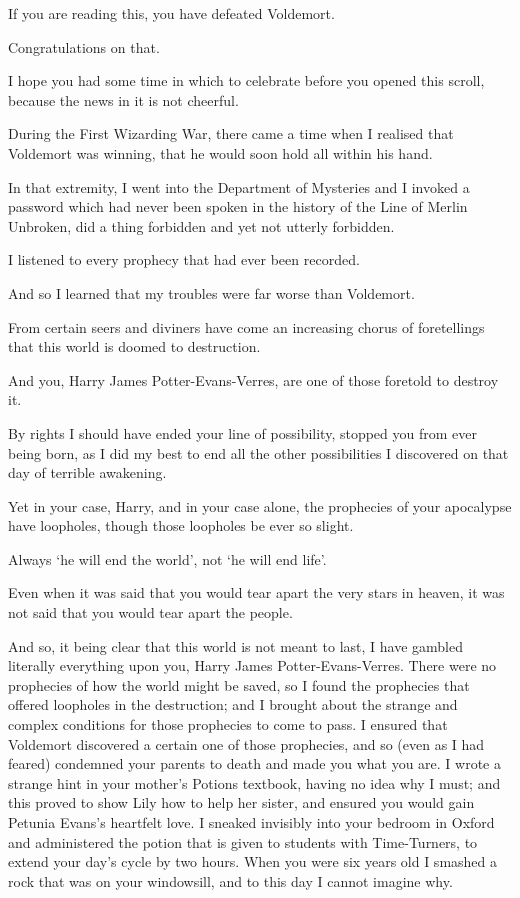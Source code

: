 \begin{writtenNote}

If you are reading this, you have defeated Voldemort.

Congratulations on that.

I hope you had some time in which to celebrate before you opened this scroll, because the news in it is not cheerful.

During the First Wizarding War, there came a time when I realised that Voldemort was winning, that he would soon hold all within his hand.

In that extremity, I went into the Department of Mysteries and I invoked a password which had never been spoken in the history of the Line of Merlin Unbroken, did a thing forbidden and yet not utterly forbidden.

I listened to every prophecy that had ever been recorded.

And so I learned that my troubles were far worse than Voldemort.

From certain seers and diviners have come an increasing chorus of foretellings that this world is doomed to destruction.

And you, Harry James Potter-Evans-Verres, are one of those foretold to destroy it.

By rights I should have ended your line of possibility, stopped you from ever being born, as I did my best to end all the other possibilities I discovered on that day of terrible awakening.

Yet in your case, Harry, and in your case alone, the prophecies of your apocalypse have loopholes, though those loopholes be ever so slight.

Always ‘he will end the world’, not ‘he will end life’.

Even when it was said that you would tear apart the very stars in heaven, it was not said that you would tear apart the people.

And so, it being clear that this world is not meant to last, I have gambled literally everything upon you, Harry James Potter-Evans-Verres. There were no prophecies of how the world might be saved, so I found the prophecies that offered loopholes in the destruction; and I brought about the strange and complex conditions for those prophecies to come to pass. I ensured that Voldemort discovered a certain one of those prophecies, and so (even as I had feared) condemned your parents to death and made you what you are. I wrote a strange hint in your mother’s Potions textbook, having no idea why I must; and this proved to show Lily how to help her sister, and ensured you would gain Petunia Evans’s heartfelt love. I sneaked invisibly into your bedroom in Oxford and administered the potion that is given to students with Time-Turners, to extend your day’s cycle by two hours. When you were six years old I smashed a rock that was on your windowsill, and to this day I cannot imagine why.


\end{writtenNote}

